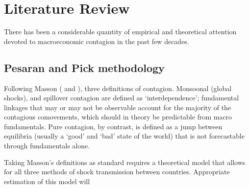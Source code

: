 \documentclass[../base.tex]{subfiles}
\begin{document}
\section{Literature Review}

There has been a considerable quantity of empirical and theoretical attention devoted to macroeconomic contagion in the past few decades. 

\subsection{Pesaran and Pick methodology}
Following Masson (\cite{masson1998contagion} and \cite{masson1999contagion}), three definitions of contagion. Monsoonal (global shocks), and spillover contagion are defined as `interdependence'; fundamental linkages that may or may not be observable account for the majority of the contagious comovements, which should in theory be predictable from macro fundamentals. Pure contagion, by contrast, is defined as a jump between equilibria (usually a `good' and `bad' state of the world) that is not forecastable through fundamentals alone. 

Taking Masson's definitions as standard requires a theoretical model that allows for all three methods of shock transmission between countries. Appropriate estimation of this model will 
\end{document}
